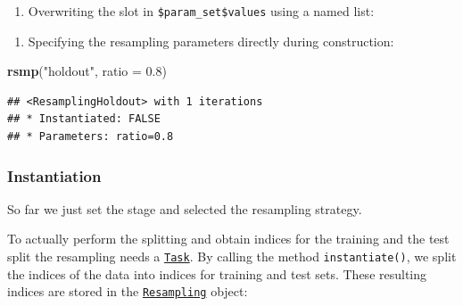 \documentclass[]{article}
\newenvironment{Shaded}{\begin{snugshade}}{\end{snugshade}}
\newcommand{\DataTypeTok}[1]{\textcolor[rgb]{0.13,0.29,0.53}{#1}}
\newcommand{\FloatTok}[1]{\textcolor[rgb]{0.00,0.00,0.81}{#1}}
\newcommand{\KeywordTok}[1]{\textcolor[rgb]{0.13,0.29,0.53}{\textbf{#1}}}
\newcommand{\NormalTok}[1]{#1}
\newcommand{\OperatorTok}[1]{\textcolor[rgb]{0.81,0.36,0.00}{\textbf{#1}}}
\newcommand{\StringTok}[1]{\textcolor[rgb]{0.31,0.60,0.02}{#1}}
\providecommand{\tightlist}{%
  \setlength{\itemsep}{0pt}\setlength{\parskip}{0pt}}
\renewenvironment{Shaded} {\begin{snugshade}\small} {\end{snugshade}}
\begin{document}
\begin{enumerate}
\def\labelenumi{\arabic{enumi}.}
\tightlist
\item
  Overwriting the slot in \texttt{\$param\_set\$values} using a named list:
\end{enumerate}

\begin{Shaded}
\end{Shaded}

\begin{enumerate}
\def\labelenumi{\arabic{enumi}.}
\setcounter{enumi}{1}
\tightlist
\item
  Specifying the resampling parameters directly during construction:
\end{enumerate}

\begin{Shaded}
\begin{Highlighting}[]
\KeywordTok{rsmp}\NormalTok{(}\StringTok{"holdout"}\NormalTok{, }\DataTypeTok{ratio =} \FloatTok{0.8}\NormalTok{)}
\end{Highlighting}
\end{Shaded}

\begin{verbatim}
## <ResamplingHoldout> with 1 iterations
## * Instantiated: FALSE
## * Parameters: ratio=0.8
\end{verbatim}

\hypertarget{resampling-inst}{%
\subsubsection{Instantiation}\label{resampling-inst}}

So far we just set the stage and selected the resampling strategy.

To actually perform the splitting and obtain indices for the training and the test split the resampling needs a \href{https://mlr3.mlr-org.com/reference/Task.html}{\texttt{Task}}.
By calling the method \texttt{instantiate()}, we split the indices of the data into indices for training and test sets.
These resulting indices are stored in the \href{https://mlr3.mlr-org.com/reference/Resampling.html}{\texttt{Resampling}} object:
\end{document}
